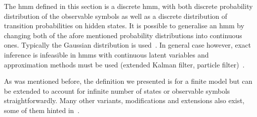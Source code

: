 The \gls{hmm} defined in this section is a discrete \acrlong{hmm}, with both discrete probability distribution of the observable symbols as well as a discrete distribution of transition probabilities on hidden states. It is possible to generalise an \gls{hmm} by changing both of the afore mentioned probability distributions into continuous ones. Typically the Gaussian distribution is used~\cite{cappe2005, piyathilaka2013}. In general case however, exact inference is infeasible in \glspl{hmm} with continuous latent variables and approximation methods must be used (extended Kalman filter, particle filter)~\cite{cappe2005}.

As was mentioned before, the definition we presented is for a finite model but can be extended to account for infinite number of states or observable symbols straightforwardly. Many other variants, modifications and extensions also exist, some of them hinted in~\cite{Rabiner89hmm}.

